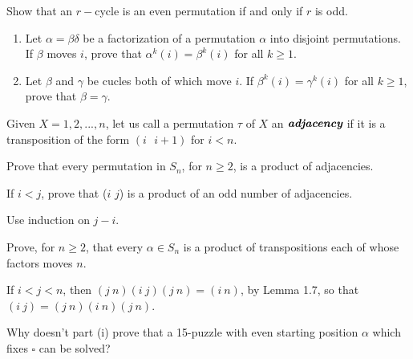 \documentclass[15pt]{article}
\newenvironment{exercise}[2][Exercise]{\begin{trivlist}
\item[\hskip \labelsep {\bfseries #1}\hskip \labelsep {\bfseries #2.}]}
{\end{trivlist}}
\newenvironment{hint}[2][Hint]{\begin{trivlist}
    \item[\hskip \labelsep {\bfseries #1}\hskip \labelsep {\bfseries #2.}]}
    {\end{trivlist}}
\begin{document}
\begin{exercise}{1.14}

    Show that an $r-$cycle is an even permutation if and only if $r$ is odd.
\end{exercise}



\begin{exercise}{1.15}
    \begin{enumerate}
        \item[(i)] Let $\alpha = \beta\delta$ be a factorization of a permutation $\alpha$ into disjoint permutations. If $\beta$ moves $i$, prove that $\alpha^k(i) = \beta^k(i)$ for all $k \geq 1$.
        
        \item[(ii)] Let $\beta$ and $\gamma$ be cucles both of which move $i$. If $\beta^k(i) = \gamma^k(i)$ for all $k\geq 1$, prove that $\beta = \gamma$.
    \end{enumerate}
    
\end{exercise}



\begin{exercise}{1.16}

    Given $X={1,2,...,n}$, let us call a permutation $\tau$ of $X$ an $\textit{\textbf{adjacency}}$ if it is a transposition of the form $(i \text{ }i+1)$ for $i<n$.
    \begin{enumerate}
        \item[(i)] Prove that every permutation in $S_n$, for $n\geq2$, is a product of adjacencies.
        \item[(ii)] If $i<j$, prove that ($i$ $j$) is a product of an odd number of adjacencies.
        \begin{hint}{}
            Use induction on $j-i$.
        \end{hint}
    \end{enumerate}

    
\end{exercise}



\begin{exercise}{1.17}
    \begin{enumerate}
        \item[(i)] Prove, for $n\geq2$, that every $\alpha\in S_n$ is a product of transpositions each of whose factors moves $n$.
        \begin{hint}{} 
            If $i<j<n$, then $(j\:n)(i\:j)(j\:n) = (i\:n)$, by Lemma 1.7, so that $(i\:j) = (j\:n)(i\:n)(j\:n)$.
        \end{hint}
        \item[(ii)] Why doesn't part (i) prove that a 15-puzzle with even starting position $\alpha$ which fixes $\square$ can be solved?
    \end{enumerate}
    
\end{exercise}
\end{document}
